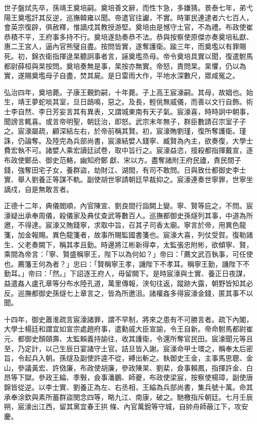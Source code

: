 世子盤烒先卒，孫靖王奠培嗣。奠培善文辭，而性卞急，多嫌猜。景泰七年，弟弋陽王奠壏訐其反逆，巡撫韓雍以聞。帝遣官往讞，不實。時軍民連逮者六七百人，會英宗復辟，俱赦釋，惟謫戍其教授游堅。奠培由是憾守土官，不為禮。布政使崔恭積不平，王府事多持不行。奠培遂劾奏恭不法。恭與按察使原傑亦奏奠培私獻、惠二王宮人，逼內官熊璧自盡。按問皆實，遂奪護衛。踰三年，而奠壏以有罪賜死。初，錦衣衛指揮逯杲聽詗事者言，誣奠壏烝母。帝令奠培具實以聞，復遣駙馬都尉薛桓與杲按問。奠培奏無是事，杲按亦無實。帝怒，責問杲。杲懼，仍以為實，遂賜奠壏母子自盡，焚其屍。是日雷雨大作，平地水深數尺，眾咸冤之。

弘治四年，奠培薨。子康王覲鈞嗣，十年薨。子上高王宸濠嗣。其母，故娼也。始生，靖王夢蛇啖其室，旦日鴟鳴，惡之。及長，輕佻無威儀，而善以文行自飾。術士李自然、李日芳妄言其有異表，又謂城東南有天子氣。宸濠喜，時時詗中朝事，聞謗言輒喜。或言帝明聖，朝廷治，即怒。武宗末年無子，群臣數請召宗室子子之。宸濠屬疏，顧深結左右，於帝前稱其賢。初，宸濠賄劉瑾，復所奪護衛。瑾誅，仍論奪。及陸完為兵部尚書，宸濠結嬖人錢寧、臧賢為內主，欲奏復，大學士費宏執不可。諸嬖人乘宏讀廷試卷，取中旨行之。宸濠益恣，擅殺都指揮戴宣，逐布政使鄭岳、御史范輅，幽知府鄭獻、宋以方。盡奪諸附王府民廬，責民間子錢，強奪田宅子女，養群盜，劫財江、湖間，有司不敢問。日與致仕都御史李士實、舉人劉養正等謀不軌。副使胡世寧請朝廷早裁抑之。宸濠連奏世寧罪，世寧坐謫戍，自是無敢言者。

正德十二年，典儀閻順，內官陳宣、劉良間行詣闕上變。寧、賢等庇之，不問。宸濠疑出承奉周儀，殺儀家及典仗查武等數百人。巡撫都御史孫燧列其事，中道為所邀，不得達。宸濠又賄錢寧，求取中旨，召其子司香太廟。寧言於帝，用異色龍箋，加金報賜。異色龍箋者，故事所賜監國書箋也。宸濠大喜，列仗受賀。復勒諸生、父老奏闕下，稱其孝且勤。時邊將江彬新得幸，太監張忠附彬，欲傾寧、賢，乘間為帝言：「寧、賢盛稱寧王，陛下以為何如？」帝曰：「薦文武百執事，可任使也。薦籓王何為者？」忠曰：「賢稱寧王孝，譏陛下不孝耳。稱寧王勤，譏陛下不勤耳。」帝曰：「然。」下詔逐王府人，毋留闕下。是時宸濠與士實、養正日夜謀，益遣姦人盧孔章等分布水陸孔道，萬里傳報，浹旬往返，蹤跡大露，朝野皆知其必反。巡撫都御史孫燧七上章言之，皆為所邀沮。諸權姦多得宸濠金錢，匿其事不以聞。

十四年，御史蕭淮疏言宸濠諸罪，謂不早制，將來之患有不可勝言者。疏下內閣，大學士楊廷和謂宜如宣宗處趙府事，遣勳戚大臣宣諭，令王自新。帝命駙馬都尉崔元、都御史顏頤壽、太監賴義持諭往，收其護衛，令還所奪官民田。宸濠聞元等且至，乃定計，以己生辰日宴諸守土官。詰旦皆入謝。宸濠命甲士環之，稱奉太后密旨，令起兵入朝。孫燧及副使許逵不從，縛出斬之。執御史王金，主事馬思聰、金山，參議黃宏、許傚廉，布政使胡廉，參政陳杲、劉棐，僉事賴鳳，指揮許金、白昂等下獄。參政王綸、季斅，僉事潘鵬、師夔，布政使梁宸，按察使楊璋，副使唐錦皆從逆。以李士實、劉養正為左、右丞相，王綸為兵部尚書，集兵號十萬。命其承奉涂欽與素所蓄群盜閔念四等，略九江、南康，破之。馳檄指斥朝廷。七月壬辰朔，宸濠出江西，留其黨宜春王拱條、內官萬銳等守城，自帥舟師蔽江下，攻安慶。

